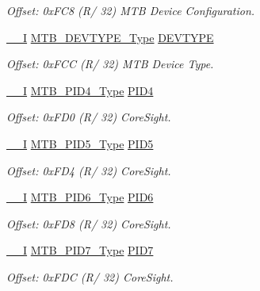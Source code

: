 \begin{DoxyCompactItemize}
\begin{DoxyCompactList}\small\item\em Offset\+: 0x\+F\+C8 (R/ 32) M\+TB Device Configuration. \end{DoxyCompactList}\item 
\mbox{\hyperlink{core__cm0plus_8h_af63697ed9952cc71e1225efe205f6cd3}{\+\_\+\+\_\+I}} \mbox{\hyperlink{union_m_t_b___d_e_v_t_y_p_e___type}{M\+T\+B\+\_\+\+D\+E\+V\+T\+Y\+P\+E\+\_\+\+Type}} \mbox{\hyperlink{struct_mtb_aaf244d52b9069c2872dea27edc025daf}{D\+E\+V\+T\+Y\+PE}}
\begin{DoxyCompactList}\small\item\em Offset\+: 0x\+F\+CC (R/ 32) M\+TB Device Type. \end{DoxyCompactList}\item 
\mbox{\hyperlink{core__cm0plus_8h_af63697ed9952cc71e1225efe205f6cd3}{\+\_\+\+\_\+I}} \mbox{\hyperlink{union_m_t_b___p_i_d4___type}{M\+T\+B\+\_\+\+P\+I\+D4\+\_\+\+Type}} \mbox{\hyperlink{struct_mtb_aca0f469f6cb244e65524831bed87a5b6}{P\+I\+D4}}
\begin{DoxyCompactList}\small\item\em Offset\+: 0x\+F\+D0 (R/ 32) Core\+Sight. \end{DoxyCompactList}\item 
\mbox{\hyperlink{core__cm0plus_8h_af63697ed9952cc71e1225efe205f6cd3}{\+\_\+\+\_\+I}} \mbox{\hyperlink{union_m_t_b___p_i_d5___type}{M\+T\+B\+\_\+\+P\+I\+D5\+\_\+\+Type}} \mbox{\hyperlink{struct_mtb_ae9166eb394032edca3031ce2bd2cd5a7}{P\+I\+D5}}
\begin{DoxyCompactList}\small\item\em Offset\+: 0x\+F\+D4 (R/ 32) Core\+Sight. \end{DoxyCompactList}\item 
\mbox{\hyperlink{core__cm0plus_8h_af63697ed9952cc71e1225efe205f6cd3}{\+\_\+\+\_\+I}} \mbox{\hyperlink{union_m_t_b___p_i_d6___type}{M\+T\+B\+\_\+\+P\+I\+D6\+\_\+\+Type}} \mbox{\hyperlink{struct_mtb_a493aeb34689360563c695b1f9ab2d958}{P\+I\+D6}}
\begin{DoxyCompactList}\small\item\em Offset\+: 0x\+F\+D8 (R/ 32) Core\+Sight. \end{DoxyCompactList}\item 
\mbox{\hyperlink{core__cm0plus_8h_af63697ed9952cc71e1225efe205f6cd3}{\+\_\+\+\_\+I}} \mbox{\hyperlink{union_m_t_b___p_i_d7___type}{M\+T\+B\+\_\+\+P\+I\+D7\+\_\+\+Type}} \mbox{\hyperlink{struct_mtb_ad4eeeae421a4ef2b6db6e5fdc5e1cb01}{P\+I\+D7}}
\begin{DoxyCompactList}\small\item\em Offset\+: 0x\+F\+DC (R/ 32) Core\+Sight. \end{DoxyCompactList}\item 

\end{DoxyCompactItemize}
